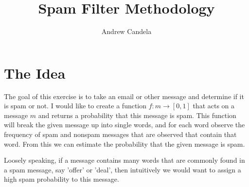 \documentclass[11pt, oneside]{article}   	%
\title{Spam Filter Methodology}
\author{Andrew Candela}
\begin{document}
\maketitle
\newpage
\section*{The Idea}
The goal of this exercise is to take an email or other message and determine if it is spam or not. I would like to create a function $f: m \rightarrow [0,1]$ that acts on a message $m$ and returns a probability that this message is spam. This function will break the given message up into single words, and for each word observe the frequency of spam and nonspam messages that are observed that contain that word. From this we can estimate the probability that the given message is spam.

Loosely speaking, if a message contains many words that are commonly found in a spam message, say 'offer' or 'deal', then intuitively we would want to assign a high spam probability to this message.
\end{document}

